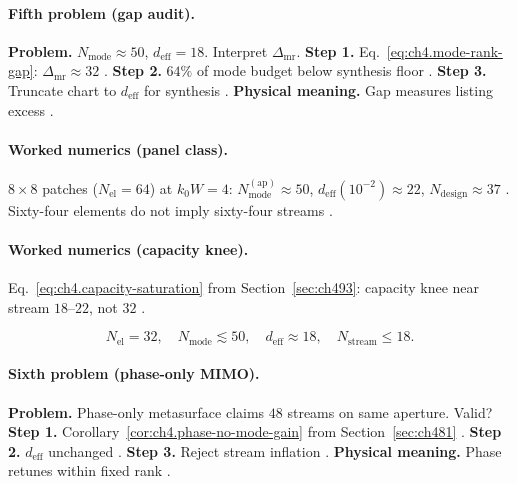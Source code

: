 \paragraph{Fifth problem (gap audit).}
\textbf{Problem.} \(N_{\mathrm{mode}}\approx50\), \(d_{\mathrm{eff}}=18\). Interpret \(\Delta_{\mathrm{mr}}\).
\textbf{Step 1.} Eq.~\eqref{eq:ch4.mode-rank-gap}: \(\Delta_{\mathrm{mr}}\approx32\) \cite{hansen1988,harrington2001,devaney2004}.
\textbf{Step 2.} \(64\%\) of mode budget below synthesis floor \cite{stratton1941,jackson1999,collin2001}.
\textbf{Step 3.} Truncate chart to \(d_{\mathrm{eff}}\) for synthesis \cite{harrington2001,devaney2004}.
\textbf{Physical meaning.} Gap measures listing excess \cite{hansen1988,stratton1941}.

\paragraph{Worked numerics (panel class).}
\(8\times8\) patches (\(N_{\mathrm{el}}=64\)) at \(k_{0}W=4\): \(N_{\mathrm{mode}}^{\mathrm{(ap)}}\approx50\), \(d_{\mathrm{eff}}(10^{-2})\approx22\),
\(N_{\mathrm{design}}\approx37\) \cite{collin2001,harrington2001,hansen1988,stratton1941,devaney2004,jackson1999}. Sixty-four elements do not imply sixty-four streams
\cite{harrington2001,stratton1941}.

\paragraph{Worked numerics (capacity knee).}
Eq.~\eqref{eq:ch4.capacity-saturation} from Section~\ref{sec:ch493}: capacity knee near stream \(18\)--\(22\), not \(32\) \cite{harrington2001,devaney2004,hansen1988,jackson1999,collin2001,stratton1941}.

\begin{equation}
\label{eq:ch4.ex-mode-rank-ineq}
N_{\mathrm{el}}=32,\quad N_{\mathrm{mode}}\lesssim50,\quad d_{\mathrm{eff}}\approx18,\quad N_{\mathrm{stream}}\le18.
\end{equation}

\paragraph{Sixth problem (phase-only MIMO).}
\textbf{Problem.} Phase-only metasurface claims \(48\) streams on same aperture. Valid?
\textbf{Step 1.} Corollary~\ref{cor:ch4.phase-no-mode-gain} from Section~\ref{sec:ch481} \cite{devaney2004,harrington2001,stratton1941}.
\textbf{Step 2.} \(d_{\mathrm{eff}}\) unchanged \cite{hansen1988,jackson1999,collin2001}.
\textbf{Step 3.} Reject stream inflation \cite{harrington2001,devaney2004}.
\textbf{Physical meaning.} Phase retunes within fixed rank \cite{stratton1941,hansen1988}.

